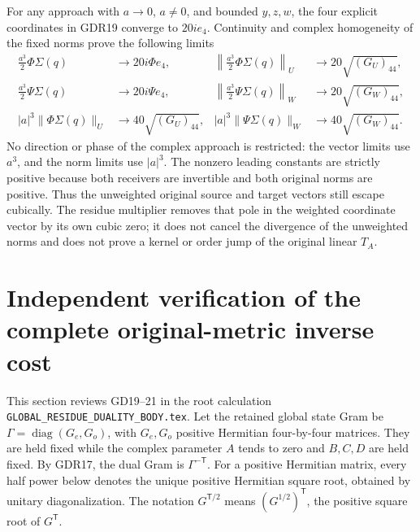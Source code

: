 \documentclass[10pt]{article}
\newcommand{\diag}{\operatorname{diag}}
\begin{document}
For any approach with $a\to0$, $a\ne0$, and bounded
$y,z,w$, the four explicit coordinates in GDR19 converge to
$20ie_4$. Continuity and complex homogeneity of the fixed
norms prove the following limits
\begin{equation}
 \begin{aligned}
 \frac{a^3}{2}\Phi\Sigma(q)&\longrightarrow20i\Phi e_4,
 &\left\|\frac{a^3}{2}\Phi\Sigma(q)\right\|_U
     &\longrightarrow20\sqrt{(G_U)_{44}},\\
 \frac{a^3}{2}\Psi\Sigma(q)&\longrightarrow20i\Psi e_4,
 &\left\|\frac{a^3}{2}\Psi\Sigma(q)\right\|_W
     &\longrightarrow20\sqrt{(G_W)_{44}},\\
 |a|^3\|\Phi\Sigma(q)\|_U&\longrightarrow40\sqrt{(G_U)_{44}},
 &|a|^3\|\Psi\Sigma(q)\|_W
     &\longrightarrow40\sqrt{(G_W)_{44}}.
 \end{aligned}
 \tag{GDR22}
\end{equation}
No direction or phase of the complex approach is restricted:
the vector limits use $a^3$, and the norm limits use
$|a|^3$. The nonzero leading constants are strictly positive
because both receivers are invertible and both original
norms are positive. Thus the unweighted original source and
target vectors still escape cubically. The residue multiplier
removes that pole in the weighted coordinate vector by its
own cubic zero; it does not cancel the divergence of the
unweighted norms and does not prove a kernel or order jump
of the original linear $T_A$.

\section{Independent verification of the complete original-metric inverse cost}
This section reviews GD19--21 in the root calculation
\texttt{GLOBAL\_RESIDUE\_DUALITY\_BODY.tex}. Let the retained
global state Gram be $\Gamma=\diag(G_e,G_o)$, with $G_e,G_o$
positive Hermitian four-by-four matrices. They are held fixed
while the complex parameter $A$ tends to zero and $B,C,D$
are held fixed. By GDR17, the dual Gram is $\Gamma^{-\mathsf T}$.
For a positive Hermitian matrix, every half power below denotes
the unique positive Hermitian square root, obtained by unitary
diagonalization. The notation $G^{\mathsf T/2}$ means
$(G^{1/2})^{\mathsf T}$, the positive square root of
$G^{\mathsf T}$.
\end{document}
